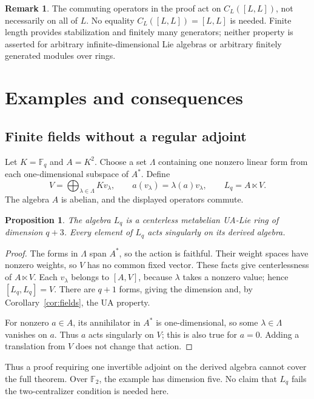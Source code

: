 \documentclass[11pt]{article}
\newtheorem{proposition}[theorem]{Proposition}
\theoremstyle{definition}
\newtheorem{remark}[theorem]{Remark}
\begin{document}
\begin{remark}
The commuting operators in the proof act on $C_L([L,L])$, not necessarily on all of $L$. No equality $C_L([L,L])=[L,L]$ is needed. Finite length provides stabilization and finitely many generators; neither property is asserted for arbitrary infinite-dimensional Lie algebras or arbitrary finitely generated modules over rings.
\end{remark}

\section{Examples and consequences}\label{sec:examples}
\subsection{Finite fields without a regular adjoint}
Let $K=\mathbb F_q$ and $A=K^2$. Choose a set $\Lambda$ containing one nonzero linear form from each one-dimensional subspace of $A^*$. Define
\[
 V=\bigoplus_{\lambda\in\Lambda}K v_\lambda,
 \qquad a(v_\lambda)=\lambda(a)v_\lambda,
 \qquad L_q=A\ltimes V.
\]
The algebra $A$ is abelian, and the displayed operators commute.

\begin{proposition}\label{prop:finite}
The algebra $L_q$ is a centerless metabelian UA-Lie ring of dimension $q+3$. Every element of $L_q$ acts singularly on its derived algebra.
\end{proposition}
\begin{proof}
The forms in $\Lambda$ span $A^*$, so the action is faithful. Their weight spaces have nonzero weights, so $V$ has no common fixed vector. These facts give centerlessness of $A\ltimes V$. Each $v_\lambda$ belongs to $[A,V]$, because $\lambda$ takes a nonzero value; hence $[L_q,L_q]=V$. There are $q+1$ forms, giving the dimension and, by Corollary~\ref{cor:fields}, the UA property.

For nonzero $a\in A$, its annihilator in $A^*$ is one-dimensional, so some $\lambda\in\Lambda$ vanishes on $a$. Thus $a$ acts singularly on $V$; this is also true for $a=0$. Adding a translation from $V$ does not change that action.
\end{proof}

Thus a proof requiring one invertible adjoint on the derived algebra cannot cover the full theorem. Over $\mathbb F_2$, the example has dimension five. No claim that $L_q$ fails the two-centralizer condition is needed here.
\end{document}
